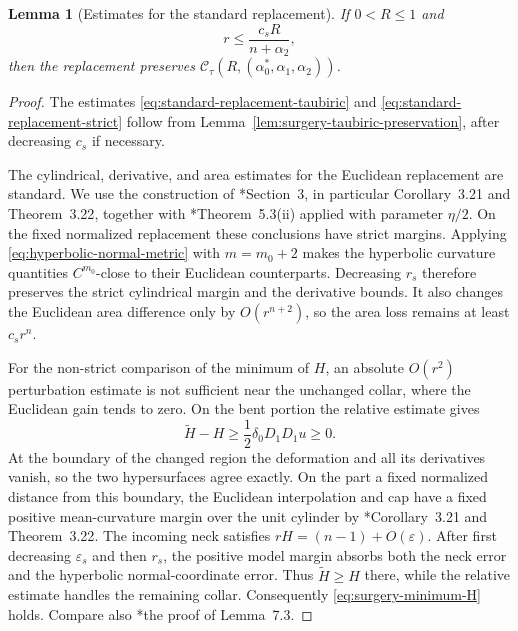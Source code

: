 \documentclass[11pt,reqno]{amsart}
\newtheorem{lemma}[proposition]{Lemma}
\theoremstyle{definition}
\theoremstyle{remark}
\numberwithin{equation}{section}
\newcommand{\eps}{\varepsilon}
\newcommand{\CC}{\mathcal C}
\begin{document}
\begin{lemma}[Estimates for the standard replacement]
  If $0<R\leq1$ and
  \begin{equation}\label{eq:surgery-radius-class-bound}
    r\leq\frac{c_sR}{n+\alpha_2},
  \end{equation}
  then the replacement preserves
  $\CC_\tau(R,(\alpha_0^*,\alpha_1,\alpha_2))$.
\end{lemma}

\begin{proof}
  The estimates \eqref{eq:standard-replacement-taubiric} and
\eqref{eq:standard-replacement-strict} follow from
  Lemma~\ref{lem:surgery-taubiric-preservation}, after decreasing $c_s$ if
  necessary.

  The cylindrical, derivative, and area estimates for the Euclidean
  replacement are standard.  We use the construction of
  \cite{HS09}*{Section~3, in particular Corollary~3.21 and Theorem~3.22},
  together with \cite{HS09}*{Theorem~5.3(ii)} applied with parameter
  $\eta/2$.  On the fixed normalized replacement these conclusions have
  strict margins.  Applying \eqref{eq:hyperbolic-normal-metric} with
  $m=m_0+2$ makes the hyperbolic curvature quantities $C^{m_0}$-close to
  their Euclidean counterparts.
  Decreasing $r_s$ therefore preserves the strict cylindrical margin and the
  derivative bounds.  It also changes the Euclidean area difference only by
  $O(r^{n+2})$, so the area loss remains at least $c_sr^n$.

  For the non-strict comparison of the minimum of $H$, an absolute
  $O(r^2)$ perturbation estimate is not sufficient near the unchanged collar,
  where the Euclidean gain tends to zero.  On the bent portion the relative
  estimate gives
  \begin{equation*}
  \widetilde H-H
  \geq
  \frac12\delta_0D_1D_1u\geq0.
  \end{equation*}
  At the boundary of the changed region the deformation and all its
  derivatives vanish, so the two hypersurfaces agree exactly.  On the part a
  fixed normalized distance from this boundary, the Euclidean interpolation
  and cap have a fixed positive mean-curvature margin over the unit cylinder
  by \cite{HS09}*{Corollary~3.21 and Theorem~3.22}.  The incoming neck satisfies
  $rH=(n-1)+O(\eps)$.  After first decreasing $\eps_s$ and then $r_s$, the
  positive model margin absorbs both the neck error and the hyperbolic
  normal-coordinate error.  Thus $\widetilde H\geq H$ there, while the relative
  estimate handles the remaining collar.  Consequently
  \eqref{eq:surgery-minimum-H} holds.  Compare also
  \cite{BH17}*{the proof of Lemma~7.3}.


\end{proof}
\end{document}
